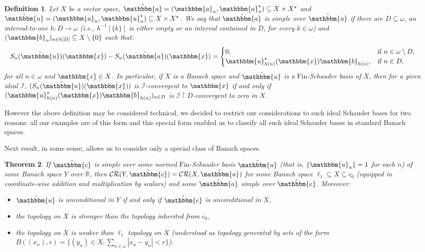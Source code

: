 \documentclass{amsart}
\newcommand{\I}{\mathcal{I}}
\newcommand{\Fin}{\mathrm{Fin}}
\newcommand{\CR}{\mathcal{CR}}
\newcommand{\w}{\mathbbm}
\newtheorem{theorem}{Theorem}[section]
\newtheorem{definition}[theorem]{Definition}
\begin{document}
\begin{definition}
\label{def-simple}
Let $X$ be a vector space, $\hat{\w{a}}=(\w{a}_n,\w{a}^\star_n)\subseteq X\times X^\star$ and $\hat{\w{u}}=(\w{u}_n,\w{u}^\star_n)\subseteq X\times X^\star$. We say that $\hat{\w{a}}$ is simple over $\hat{\w{u}}$ if there are $D\subseteq\omega$, an interval-to-one $h:D\to\omega$ (i.e., $h^{-1}[\{k\}]$ is either empty or an interval contained in $D$, for every $k\in\omega$) and $(\w{b}_n)_{n\in h[D]}\subseteq X\setminus\{0\}$ such that:
\[
S_n(\hat{\w{u}})(\w{x})-S_n(\hat{\w{a}})(\w{x})=
\begin{cases}
    0, & \text{if }n\in\omega\setminus D,\\
    \w{u}_{h(n)}^\star(\w{x})\w{b}_{h(n)}, & \text{if }n\in D,
\end{cases}
\]
for all $n\in \omega$ and $\w{x}\in X$. In particular, if $X$ is a Banach space and $\hat{\w{u}}$ is a $\Fin$-Schauder basis of $X$, then for a given ideal $\I$, $(S_n(\hat{\w{a}})(\w{x}))$ is $\I$-convergent to $\w{x}$ if and only if $(\w{u}_{h(n)}^\star(\w{x})\w{b}_{h(n)})_{n\in D}$ is $\I\restriction D$-convergent to zero in $X$.
\end{definition}

However the above definition may be considered technical, we decided to restrict our considerations to such ideal Schauder bases for two reasons: all our examples are of this form and this special form enabled us to classify all such ideal Schauder bases in standard Banach spaces.

Next result, in some sense, allows us to consider only a special class of Banach spaces.

\begin{theorem}
If $\hat{\w{c}}$ is simple over some normed $\Fin$-Schauder basis $\hat{\w{u}}$ (that is, $\|\w{u}_n\|=1$ for each $n$) of some Banach space $Y$ over $\mathbb{R}$, then $\CR(Y,\hat{\w{c}})=\CR(X,\hat{\w{a}})$ for some Banach space $\ell_1\subseteq X\subseteq c_0$ (equipped in coordinate-wise addition and multiplication by scalars) and some $\hat{\w{a}}$ simple over $\hat{\w{e}}$. Moreover:
\begin{itemize}
    \item[(i)] $\hat{\w{u}}$ is unconditional in $Y$ if and only if $\hat{\w{e}}$ is unconditional in $X$,
    \item[(ii)] the topology on $X$ is stronger than the topology inherited from $c_0$,
    \item[(iii)] the topology on $X$ is weaker than $\ell_1$ topology on $X$ (understood as topology generated by sets of the form $B((x_n),r)=\{(y_n)\in X : \sum_{n\in\omega} |x_n-y_n|<r\}$).
\end{itemize}
\end{theorem}
\end{document}
